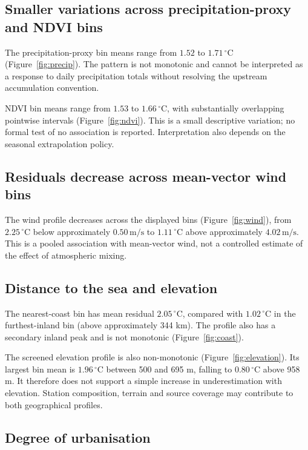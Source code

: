 \documentclass[a4paper,12pt,leqno]{article}
\begin{document}
\subsection{Smaller variations across precipitation-proxy and NDVI bins}
\label{sec:results-precip}

The precipitation-proxy bin means range from $1.52$ to $1.71\,^\circ$C
(Figure~\ref{fig:precip}). The pattern is not monotonic and cannot be
interpreted as a response to daily precipitation totals without resolving
the upstream accumulation convention.

NDVI bin means range from $1.53$ to $1.66\,^\circ$C, with substantially
overlapping pointwise intervals (Figure~\ref{fig:ndvi}). This is a small
descriptive variation; no formal test of no association is reported.
Interpretation also depends on the seasonal extrapolation policy.

\subsection{Residuals decrease across mean-vector wind bins}
\label{sec:results-wind}

The wind profile decreases across the displayed bins
(Figure~\ref{fig:wind}), from $2.25\,^\circ$C below approximately
$0.50\,\mathrm{m/s}$ to $1.11\,^\circ$C above approximately
$4.02\,\mathrm{m/s}$. This is a pooled association with mean-vector wind,
not a controlled estimate of the effect of atmospheric mixing.

\subsection{Distance to the sea and elevation}
\label{sec:results-geo}

The nearest-coast bin has mean residual $2.05\,^\circ$C, compared with
$1.02\,^\circ$C in the furthest-inland bin (above approximately 344 km).
The profile also has a secondary inland peak and is not monotonic
(Figure~\ref{fig:coast}).

The screened elevation profile is also non-monotonic
(Figure~\ref{fig:elevation}). Its largest bin mean is $1.96\,^\circ$C
between 500 and 695 m, falling to $0.80\,^\circ$C above 958 m.
It therefore does not support a simple increase in underestimation with
elevation. Station composition, terrain and source coverage may contribute
to both geographical profiles.

\subsection{Degree of urbanisation}
\label{sec:results-degurba}
\end{document}
